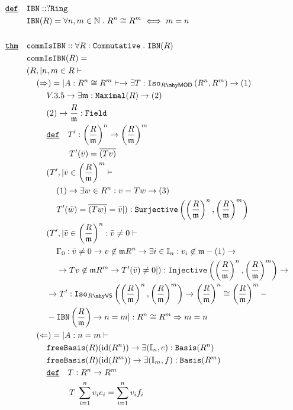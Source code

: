 \documentclass[12pt]{article}
\renewcommand{\.}{\; . \;}
\newcommand{\nat}{\mathbb{N}}
\newcommand{\De}{\underline{\mathtt{def}} \quad}
\newcommand{\Thm}{\underline{\mathtt{thm}} \quad}
\newcommand{\ring}{\mathtt{Ring}}
\newcommand{\MOD}[1]{#1 \mhy \mathsf{MOD} }
\newcommand{\VS}[1]{#1 \mhy \mathsf{VS} }
\newcommand{\field}{\mathtt{Field}}
\newcommand{\inj}{\mathtt{Injective}}
\newcommand{\surj}{\mathtt{Surjective}}
\newcommand{\iso}[3]{\mathtt{Iso}_{#1}\left(#2,#3 \right)}
\newcommand{\basis}{\mathtt{Basis}}
\newcommand{\commu}{\mathtt{Commutative}}
\newcommand{\context}{\vdash}
\begin{document}
\begin{align*}
\De & \mathtt{IBN} :: ?\ring \\
&   \mathtt{IBN}(R) = \forall n,m \in \nat \. R^n \cong R^m \iff m = n \\ \\
\Thm & \mathtt{commIsIBN} :: \forall R : \commu \. \mathtt{IBN}(R)
\\ &  \mathtt{commIsIBN}(R) = \\
&  (R, | n,m \in R \context \\
& \kern 1pc  (\Rightarrow) =| A : R^n \cong R^m \context \to \exists T : \iso{\MOD{R}}{R^n}{R^m} \to (1) \\
& \kern 2pc V.3.5 \to \exists \mathfrak{m} : \mathtt{Maximal}(R) \to (2) \\
& \kern 2pc (2) \to \frac{R}{\mathfrak{m}}:\field \\
& \kern 2pc \De T' 
	: \left( \frac{R}{\mathfrak{m}} \right)^n \to \left( \frac{R}{\mathfrak{m}} \right)^m \\
&  \kern 4.3pc T'(\bar{v} ) = \overline{(Tv)} \\
& \kern 2pc (T', | \bar{v} \in   \left( \frac{R}{\mathfrak{m}} \right)^m \context \\
& \kern 3pc  (1) \to \exists w \in R^n : v = Tw \to (3) \\
& \kern 3pc  T'(\bar{w}) = \overline{(Tw)} = \bar{v} | ) 
	: \surj\left(\left( \frac{R}{\mathfrak{m}} \right)^n 
	, \left( \frac{R}{\mathfrak{m}} \right)^m \right) \\
& \kern 2pc (T', | \bar{v} \in   \left( \frac{R}{\mathfrak{m}} \right)^n : 
	\bar{v} \neq 0 \context \\ 
& \kern 3pc  \Gamma_0 : \bar{v} \neq 0 \to v \not \in \mathfrak{m}R^n \to 
\exists i \in \mathbb{I}_n : v_i \not \in \mathfrak{m} -(1) \to \\
& \kern 3pc \to Tv \not \in \mathfrak{m}R^m \to T'(\bar{v}) \neq 0 |) : \inj
 \left(\left( \frac{R}{\mathfrak{m}} \right)^n , 
 \left( \frac{R}{\mathfrak{m}} \right)^m \right) \to \\
& \kern 2pc \to T' : \iso{\VS{R}}{ \left( \frac{R}{\mathfrak{m}} \right)^n}{ \left( \frac{R}{\mathfrak{m}} \right)^m  } \to \left( \frac{R}{\mathfrak{m}} \right)^n  
	\cong \left( \frac{R}{\mathfrak{m}} \right)^m - \\
& \kern 2pc -\mathtt{IBN}\left( \frac{R}{\mathfrak{m}}  \right)\to n = m | :
	 R^n \cong R^m \Rightarrow m = n 	\\
& \kern 1pc (\Leftarrow) = | A : n = m \context \\
& \kern 2pc \mathtt{freeBasis}(R)(\mathrm{id}(R^n)) \to \exists (\mathbb{I}_n,e) : \basis(R^n) \\
& \kern 2pc \mathtt{freeBasis}(R)(\mathrm{id}(R^m)) \to \exists (\mathbb{I}_m,f) : \basis(R^m) \\
& \kern 2pc \De T : R^n \to R^m \\
& \kern 4.3pc T \; \sum^n_{i=1}v_ie_i = \sum^n_{i = 1}v_i f_i
\end{align*}
\end{document}
